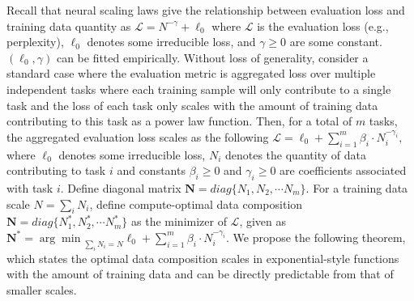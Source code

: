 \documentclass{article} %
\newcommand{\rrm}[1]{\textbf{\textcolor{red!50}{[Rafid: #1]}}}
\begin{document}
Recall that neural scaling laws give the relationship between evaluation loss and training data quantity as
$
\mathcal{L} =  N^{-\gamma} + \ell_0 
$
where $\mathcal{L}$ is the evaluation loss (e.g., perplexity), $\ell_0$ denotes some irreducible loss, and $\gamma\geq 0$ are some constant. $(\ell_0, \gamma)$ can be fitted empirically.
Without loss of generality, consider a standard case where the evaluation metric is aggregated loss over multiple independent tasks where each training sample will only contribute to a single task and the loss of each task only scales with the amount of training data contributing to this task as a power law function. Then, for a total of $m$ tasks, the aggregated evaluation loss scales as the following
$
\mathcal{L} =\ell_0+\sum_{i=1}^m \beta_i\cdot N_i^{-\gamma_i},
$
where $\ell_0$ denotes some irreducible loss, $N_i$ denotes the quantity of data contributing to task $i$ %
and constants $\beta_i\geq 0$ and $\gamma_i\geq 0$ are coefficients associated with task $i$.
Define diagonal matrix $\mathbf{N}=diag\{N_1,N_2,\cdots N_m\}$.
For a training data scale $N=\sum_i N_i$, define compute-optimal data composition $\mathbf{N}=diag\{N_1^*, N_2^*,\cdots N_m^*\}$ as the minimizer of $\mathcal{L}$, given as
$
    \mathbf{N^*} = {\arg\min}_{\sum_i N_i=N} \ell_0+\sum_{i=1}^m \beta_i\cdot N_i^{-\gamma_i}
$.
We propose the following theorem, which states the optimal data composition scales in exponential-style functions with the amount of training data and can be directly predictable from that of smaller scales.
\end{document}
